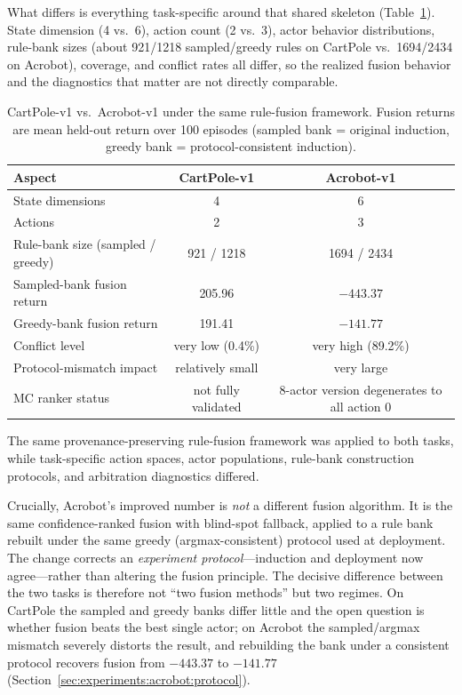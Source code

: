 \documentclass[11pt]{article}
\begin{document}
What differs is everything task-specific around that shared skeleton
(Table~\ref{tab:tasks}). State dimension (4 vs.\ 6), action count (2 vs.\ 3), actor behavior
distributions, rule-bank sizes (about 921/1218 sampled/greedy rules on CartPole vs.\
1694/2434 on Acrobot), coverage, and conflict rates all differ, so the realized fusion behavior
and the diagnostics that matter are not directly comparable.

\begin{table}[t]
\centering\small
\caption{CartPole-v1 vs.\ Acrobot-v1 under the same rule-fusion framework. Fusion returns are
mean held-out return over 100 episodes (sampled bank = original induction, greedy bank =
protocol-consistent induction).}
\label{tab:tasks}
\begin{tabular}{@{}l c c@{}}
\toprule
Aspect & CartPole-v1 & Acrobot-v1 \\
\midrule
State dimensions & 4 & 6 \\
Actions & 2 & 3 \\
Rule-bank size (sampled / greedy) & 921 / 1218 & 1694 / 2434 \\
Sampled-bank fusion return & 205.96 & $-443.37$ \\
Greedy-bank fusion return & 191.41 & $-141.77$ \\
Conflict level & very low (0.4\%) & very high (89.2\%) \\
Protocol-mismatch impact & relatively small & very large \\
MC ranker status & not fully validated & 8-actor version degenerates to all action 0 \\
\bottomrule
\end{tabular}
\end{table}

The same provenance-preserving rule-fusion framework was applied to both tasks, while
task-specific action spaces, actor populations, rule-bank construction protocols, and
arbitration diagnostics differed.

Crucially, Acrobot's improved number is \emph{not} a different fusion algorithm. It is the same
confidence-ranked fusion with blind-spot fallback, applied to a rule bank rebuilt under the
same greedy (argmax-consistent) protocol used at deployment. The change corrects an
\emph{experiment protocol}---induction and deployment now agree---rather than altering the
fusion principle. The decisive difference between the two tasks is therefore not ``two fusion
methods'' but two regimes. On CartPole the sampled and greedy banks differ little and the open
question is whether fusion beats the best single actor; on Acrobot the sampled/argmax mismatch
severely distorts the result, and rebuilding the bank under a consistent protocol recovers
fusion from $-443.37$ to $-141.77$ (Section~\ref{sec:experiments:acrobot:protocol}).
\end{document}

